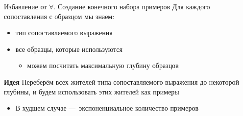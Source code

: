 \documentclass[aspectratio=169
  , xcolor={svgnames}
  , hyperref={ colorlinks,citecolor=Blue
             , linkcolor=DarkRed,urlcolor=DarkBlue}
  , russian
  ]{beamer}
\begin{document}
\begin{frame}{Избавление от $\forall$. Создание конечного набора примеров}
Для каждого сопоставления с образцом  мы знаем:
\begin{itemize}
\item тип сопоставляемого выражения
\item все образцы, которые используются
\begin{itemize}
\item можем посчитать максимальную глубину образцов
\end{itemize}
\end{itemize}

\begin{alertblock}{\textbf{Идея}}
Переберём всех жителей типа сопоставляемого выражения до некоторой глубины, и будем использовать этих жителей как примеры
\end{alertblock}
\vspace{1cm}

\begin{itemize}
\item[\faBad] В худшем случае ---~экспоненциальное количество примеров
\end{itemize}
\end{frame}

\begin{comment}
\begin{frame}{Our Method: Synthesis + Relational Interpreter}
Do \emph{not compile} with specific algorithm but \emph{synthesize} compiled representation on large enough but finite set of examples
\vspace{1cm}

Fast $\Leftrightarrow$ Small: synthesized program should contain less checks.
\vspace{1cm}

We are using relational programming, more precisely OCanren~\cite{OCanrenWeb} from miniKanren~\cite{MiniKanrenWeb} family.
\vspace{1cm}


Our repo on Github: ~\cite{Repo}.
\end{frame}
\end{comment}


\end{document}
